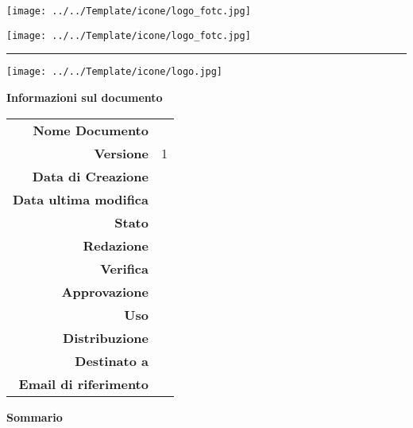 \begin{center}

\texttt{[image: ../../Template/icone/logo\_fotc.jpg]}
\begin{large} \textbf{\gruppoLink} \end{large}
\texttt{[image: ../../Template/icone/logo\_fotc.jpg]}
\vspace{0.2em}

\hrule
\vspace{3em}

\texttt{[image: ../../Template/icone/logo.jpg]}

\thispagestyle{empty}

\vfill

\begin{center} 
  \begin{Huge}
  {\fontsize{15mm}{20mm}\selectfont \progetto} 
  \end{Huge}
\end{center}

\begin{Huge} \documento \end{Huge}

\begin{center}
\textbf{Informazioni sul documento} \\ \vspace{2em}
\small
\begin{tabular}{r|l}
	\textbf{Nome Documento} & \nomedocumentofisico \\
	\textbf{Versione}	& 1\\
	\textbf{Data di Creazione} & \datacreazione\\
	\textbf{Data ultima modifica} & \datamodifica\\
	\textbf{Stato} & \stato \\
	\textbf{Redazione}	& \redazione\\
	\textbf{Verifica}	& \verifica\\
	\textbf{Approvazione}	& \approvazione\\
	\textbf{Uso}  & \uso\\
	\textbf{Distribuzione} & \gruppo \\
	\textbf{Destinato a}  &  \destinateTo \\
	\textbf{Email di riferimento} & \email
\end{tabular}
\end{center}

\normalsize
\textbf{Sommario\\} 

\end{center}
\clearpage
